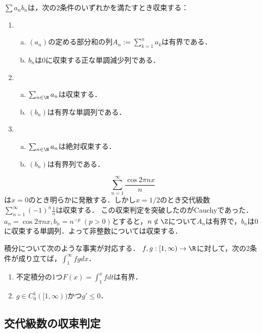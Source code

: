 \documentclass[uplatex, dvipdfmx]{jsreport}
\begin{document}
\begin{theorem}
    $\sum a_nb_n$は，次の2条件のいずれかを満たすとき収束する：
    \begin{enumerate}
        \item 
        \begin{enumerate}[(a)]
            \item $(a_n)$の定める部分和の列$A_n:=\sum_{k=1}^n a_k$は有界である．
            \item $b_n$は$0$に収束する正な単調減少列である．
        \end{enumerate}
        \item \begin{enumerate}[(a)]
            \item $\sum_{n\in\N}a_n$は収束する．
            \item $(b_n)$は有界な単調列である．
        \end{enumerate}
        \item \begin{enumerate}[(a)]
            \item $\sum_{n\in\N}a_n$は絶対収束する．
            \item $(b_n)$は有界列である．
        \end{enumerate}
    \end{enumerate}
\end{theorem}

\begin{example}
    \[\sum_{n=1}^\infty\frac{\cos 2\pi nx}{n}\]
    は$x=0$のとき明らかに発散する．しかし$x=1/2$のとき交代級数$\sum_{n=1}^\infty(-1)^n\frac{1}{n}$は収束する．
    この収束判定を突破したのがCauchyであった．
    $a_n=\cos2\pi nx,b_n=n^{-p}\;(p>0)$とすると，$n\notin\Z$について$A_n$は有界で，$b_n$は$0$に収束する単調列．よって非整数については収束する．
\end{example}

\begin{remarks}
    積分について次のような事実が対応する．
    $f,g:[1,\infty)\to\R$に対して，次の2条件が成り立てば，$\int^\infty_1fgdx$．
    \begin{enumerate}
        \item 不定積分の1つ$F(x)=\int^x_1fdt$は有界．
        \item $g\in C^1_0([1,\infty))$かつ$g'\le0$．
    \end{enumerate}
\end{remarks}

\subsection{交代級数の収束判定}
\end{document}
